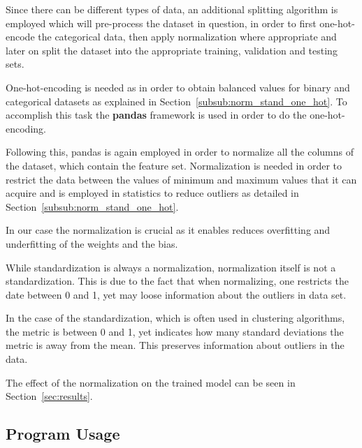 \documentclass[12pt]{article}
\begin{document}
Since there can be different types of data, an additional splitting algorithm is employed which will pre-process the dataset in question, in order to first one-hot-encode the categorical data, then apply normalization where appropriate and later on split the dataset into the appropriate training, validation and testing sets. 

One-hot-encoding is needed as in order to obtain balanced values for binary and categorical datasets as explained in Section~\ref{subsub:norm_stand_one_hot}. To accomplish this task the \textbf{pandas} framework is used in order to do the one-hot-encoding. 

Following this, pandas is again employed in order to normalize all the columns of the dataset, which contain the feature set. Normalization is needed in order to restrict the data between the values of minimum and maximum values that it can acquire and is employed in statistics to reduce outliers as detailed in Section~\ref{subsub:norm_stand_one_hot}. 

In our case the normalization is crucial as it enables reduces overfitting and underfitting of the weights and the bias. 

While standardization is always a normalization, normalization itself is not a standardization. This is due to the fact that when normalizing, one restricts the date between 0 and 1, yet may loose information about the outliers in data set.

In the case of the standardization, which is often used in clustering algorithms, the metric is between 0 and 1, yet indicates how many standard deviations the metric is away from the mean. This preserves information about outliers in the data.

The effect of the normalization on the trained model can be seen in Section~\ref{sec:results}.

\subsection{Program Usage}
\label{sub:program}
\end{document}
